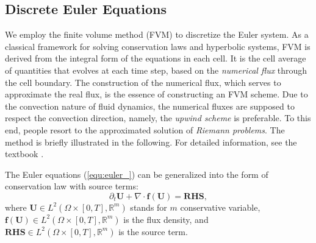 \documentclass{article}
\begin{document}
\subsection{Discrete Euler Equations}
We employ the finite volume method (FVM) to discretize the Euler system. As a classical framework for solving conservation laws and hyperbolic systems, FVM is derived from the integral form of the equations in each cell. It is the cell average of quantities that evolves at each time step, based on the \emph{numerical flux} through the cell boundary. The construction of the numerical flux, which serves to approximate the real flux, is the essence of constructing an FVM scheme. Due to the convection nature of fluid dynamics, the numerical fluxes are supposed to respect the convection direction, namely, the \emph{upwind scheme} is preferable. To this end, people resort to the approximated solution of \emph{Riemann problems}. The method is briefly illustrated in the following. For detailed information, see the textbook \cite{leveque_2002}.

The Euler equations (\ref{equ:euler_}) can be generalized into the form of conservation law with source terms:
\begin{equation} \label{equ:euler_conservation}
    \partial_t \mathbf{U} + \nabla \cdot \mathbf{f}(\mathbf{U}) = \mathbf{RHS},
\end{equation}
where $\mathbf{U} \in L^2(\Omega \times [0,T], \mathbb{R}^m)$ stands for $m$ conservative variable, $\mathbf{f}(\mathbf{U}) \in L^2(\Omega \times  [0,T], \mathbb{R}^m)$ is the flux density, and $\mathbf{RHS} \in L^2(\Omega \times  [0,T], \mathbb{R}^m)$ is the source term. 
\end{document}
